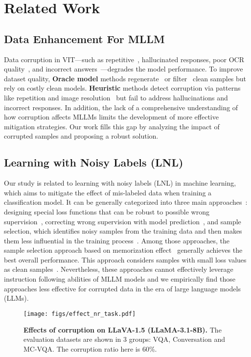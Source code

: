 \section{Related Work}
\subsection{Data Enhancement For MLLM}
Data corruption in VIT—such as repetitive~\citep{chen2024expanding,li2025eagle}, hallucinated responses, poor OCR quality~\citep{wu2024deepseek}, and incorrect answers~\citep{dubey2024llama}—degrades the model performance. To improve dataset quality, \textbf{Oracle model} methods regenerate~\citep{chen2023sharegpt4v,chen2024allava} or filter~\citep{fu2025tldr,xiong2024llava} clean samples but rely on costly clean models. \textbf{Heuristic} methods detect corruption via patterns like repetition and image resolution~\citep{chen2024expanding,li2025eagle} but fail to address hallucinations and incorrect responses. In addition, the lack of a comprehensive understanding of how corruption affects MLLMs limits the development of more effective mitigation strategies. Our work fills this gap by analyzing the impact of corrupted samples and proposing a robust solution.



\subsection{Learning with Noisy Labels (LNL)}
Our study is related to learning with noisy labels (LNL) in machine learning, which aims to mitigate the effect of mis-labeled data when training a classification model. It can be generally categorized into three main approaches~\citep{han2020survey}:
designing special loss functions that can be robust to possible wrong supervision~\cite{ghosh2017robust,zhang2018generalized,menon2019can}, 
correcting wrong supervision with model prediction~\citep{tanaka2018joint,yi2019probabilistic,zhang2020distilling},
and sample selection, which identifies noisy samples from the training data and then makes them less influential in the training process~\cite{jiang2018mentornet, han2018co,wei2020combating}. 
Among those approaches, the sample selection approach based on memorization effect~\cite{arpit2017closer,zhang2016understanding} generally achieves the best overall performance.  
This approach considers samples with small loss values as clean samples~\citep{han2018co,jiang2018mentornet,yao2020searching,10509799}. 
Nevertheless, these approaches cannot effectively leverage instruction following abilities of MLLM models and we empirically find those approaches less effective for corrupted data in the era of large language models (LLMs). 

\begin{figure*}[!]
\centering
\texttt{[image: figs/effect\_nr\_task.pdf]}
\vspace{-.3in}
\caption{\textbf{Effects of corruption on LLaVA-1.5 (LLaMA-3.1-8B).} The evaluation datasets are shown in 3 groups: VQA, Conversation and MC-VQA. The corruption ratio here is 60\%. }
\label{fig:effect_nr_task}
\end{figure*}
